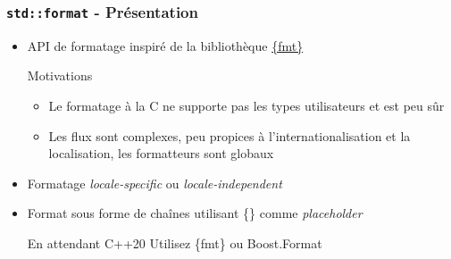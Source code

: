 \documentclass[C++.tex]{subfiles}
\begin{document}
\begin{frame}[fragile]
	\frametitle{\lstinline|std::format| - Présentation}
	\begin{itemize}
		\item API de formatage inspiré de la bibliothèque  \href{https://github.com/fmtlib/fmt}{\{fmt\}}
		
		\begin{block}{Motivations}
			\begin{itemize}
				\item Le formatage \og à la C\fg{} ne supporte pas les types utilisateurs et est peu sûr


				\item Les flux sont complexes, peu propices à l'internationalisation et la localisation, les formatteurs sont globaux

			\end{itemize}
		\end{block}

		\item Formatage \textit{locale-specific} ou \textit{locale-independent}


		\item Format sous forme de chaînes utilisant \{\} comme \textit{placeholder}

		\begin{block}{En attendant C++20}
			Utilisez \{fmt\} ou Boost.Format
		\end{block}
	\end{itemize}
\end{frame}
\end{document}
